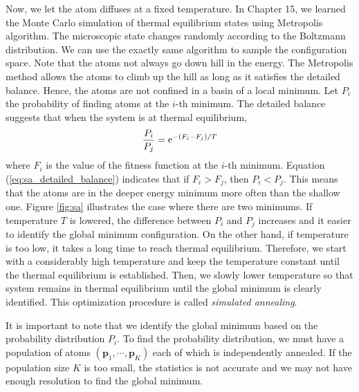 Now, we let the atom  diffuses at a fixed temperature.
In Chapter 15, we learned the Monte Carlo simulation of thermal equilibrium states using Metropolis algorithm.  The microscopic state changes randomly according to the Boltzmann distribution.  We can use the exactly same algorithm to sample the configuration space.
Note that the atoms not always go down hill in the energy.  The Metropolis method allows the atoms to climb  up the hill as long as it satisfies the detailed balance.  Hence, the atoms are not confined in a basin of a local minimum.    Let $P_i$ the probability of finding atoms at the $i$-th minimum.  The detailed balance suggests that when the system is at thermal equilibrium,
\begin{equation}\label{eq:sa_detailed_balance}
\frac{P_i}{P_j} = \text{e}^{-(F_i-F_j)/T}
\end{equation}
where $F_i$ is the value of the fitness function at the $i$-th minimum.  Equation (\ref{eq:sa_detailed_balance}) indicates that if $F_i> F_j$, then $P_i<P_j$.  This means that the atoms are in the deeper energy minimum more often than the shallow one. Figure \ref{fig:sa} illustrates the case where there are two minimums.  
If temperature $T$ is lowered, the difference between $P_i$ and $P_j$ increases and it easier to identify the global minimum configuration. On the other hand, if temperature is too low, it takes a long time to reach thermal equilibrium.  Therefore, we start with a considerably high temperature and keep the temperature constant until the thermal equilibrium is established.  Then, we slowly lower temperature so that system remains in thermal equilibrium until the global minimum is clearly identified.
This optimization procedure is called \textit{simulated annealing}.  

It is important to note that we identify the global minimum based on the probability distribution $P_i$.  To find the probability distribution, we must have a population of atoms $(\mathbf{p}_1, \cdots, \mathbf{p}_K)$ each of which is independently annealed.  If the population size $K$ is too small, the statistics is not accurate and we may not have enough resolution to find the global minimum.  

